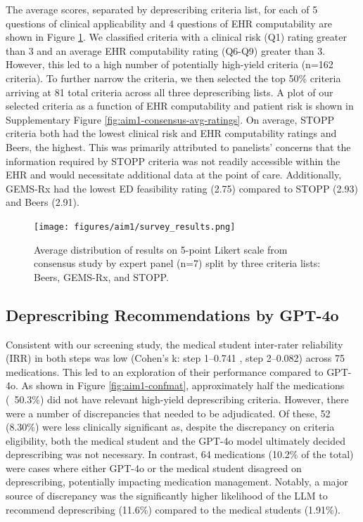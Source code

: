 The average scores, separated by deprescribing criteria list, for each of 5 questions of clinical applicability and 4 questions of EHR computability are shown in Figure \ref{fig:aim1-suvey-results}. We classified criteria with a clinical risk (Q1) rating greater than 3 and an average EHR computability rating (Q6-Q9) greater than 3. However, this led to a high number of potentially high-yield criteria (n=162 criteria). To further narrow the criteria, we then selected the top 50\% criteria arriving at 81 total criteria across all three deprescribing lists. A plot of our selected criteria as a function of EHR computability and patient risk is shown in Supplementary Figure \ref{fig:aim1-consensus-avg-ratings}. On average, STOPP criteria both had the lowest clinical risk and EHR computability ratings and Beers, the highest. This was primarily attributed to panelists' concerns that the information required by STOPP criteria was not readily accessible within the EHR and would necessitate additional data at the point of care. Additionally, GEMS-Rx had the lowest ED feasibility rating (2.75) compared to STOPP (2.93) and Beers (2.91). 

\begin{figure}[!htbp]
	\centering
	\texttt{[image: figures/aim1/survey\_results.png]}
	\caption{Average distribution of results on 5-point Likert scale from consensus study by expert panel (n=7) split by three criteria lists: Beers, GEMS-Rx, and STOPP.} \label{fig:aim1-suvey-results}
\end{figure}

\subsection{Deprescribing Recommendations by GPT-4o}


Consistent with our screening study, the medical student inter-rater reliability (IRR) in both steps was low (Cohen's k: step 1–0.741 , step 2–0.082) across 75 medications. This led to an exploration of their performance compared to GPT-4o. As shown in Figure \ref{fig:aim1-confmat}, approximately half the medications (~50.3\%) did not have relevant high-yield deprescribing criteria. However, there were a number of discrepancies that needed to be adjudicated. Of these, 52 (8.30\%) were less clinically significant as, despite the discrepancy on criteria eligibility, both the medical student and the GPT-4o model ultimately decided deprescribing was not necessary. In contrast, 64 medications (10.2\% of the total) were cases where either GPT-4o or the medical student disagreed on deprescribing, potentially impacting medication management. Notably, a major source of discrepancy was the significantly higher likelihood of the LLM to recommend deprescribing (11.6\%) compared to the medical students (1.91\%).

